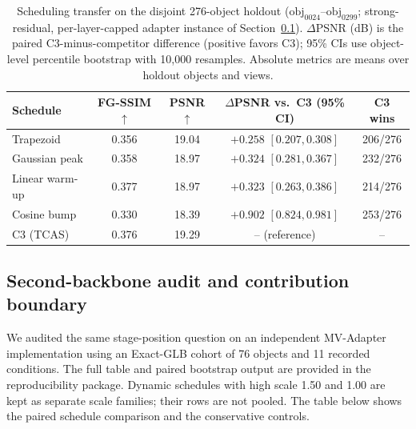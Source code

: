 \documentclass[times,twocolumn,final]{elsarticle}
\begin{document}
\begin{table}[t]
\centering
\caption{Scheduling transfer on the disjoint 276-object holdout ($\mathrm{obj}_{0024}$--$\mathrm{obj}_{0299}$; strong-residual, per-layer-capped adapter instance of Section~\ref{subsec:adapterdep}). $\Delta$PSNR (dB) is the paired C3-minus-competitor difference (positive favors C3); 95\% CIs use object-level percentile bootstrap with 10{,}000 resamples. Absolute metrics are means over holdout objects and views.}
\label{tab:holdoutsched}
\footnotesize\setlength{\tabcolsep}{2.5pt}
\begin{tabular}{lcccc}
\toprule
Schedule & FG-SSIM$\uparrow$ & PSNR$\uparrow$ & $\Delta$PSNR vs.\ C3 (95\% CI) & C3 wins \\
\midrule
Trapezoid & 0.356 & 19.04 & $+0.258$ $[0.207, 0.308]$ & 206/276 \\
Gaussian peak & 0.358 & 18.97 & $+0.324$ $[0.281, 0.367]$ & 232/276 \\
Linear warm-up & 0.377 & 18.97 & $+0.323$ $[0.263, 0.386]$ & 214/276 \\
Cosine bump & 0.330 & 18.39 & $+0.902$ $[0.824, 0.981]$ & 253/276 \\
C3 (TCAS) & 0.376 & 19.29 & -- (reference) & -- \\
\bottomrule
\end{tabular}
\end{table}


\fi

\subsection{Second-backbone audit and contribution boundary}
\label{subsec:adapterdep}

We audited the same stage-position question on an independent MV-Adapter
implementation using an Exact-GLB cohort of 76 objects and 11 recorded
conditions. The full table and paired bootstrap output are provided in the
reproducibility package. Dynamic schedules with high scale 1.50 and 1.00 are
kept as separate scale families; their rows are not pooled. The table below
shows the paired schedule comparison and the conservative controls.
\end{document}
